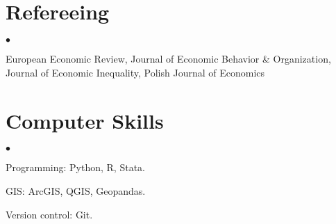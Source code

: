 \documentclass[margin,line]{res}
\newenvironment{list2}{
  \begin{list}{$\bullet$}{%
      \setlength{\itemsep}{0in}
      \setlength{\parsep}{0in} \setlength{\parskip}{0in}
      \setlength{\topsep}{0in} \setlength{\partopsep}{0in} 
      \setlength{\leftmargin}{0.2in}}}{\end{list}}
\begin{document}
\begin{resume}
\section{\sc Refereeing} 
\begin{list2}
	\item European Economic Review, Journal of Economic Behavior \& Organization, Journal of Economic Inequality, Polish Journal of Economics  
\end{list2}
\vspace*{.05in} 
\section{\sc Computer Skills} 
\begin{list2}
\item Programming: Python, R, Stata.
\item GIS:  ArcGIS, QGIS, Geopandas.
\item Version control: Git.\\ 
\end{list2}



\end{resume}
\end{document}
